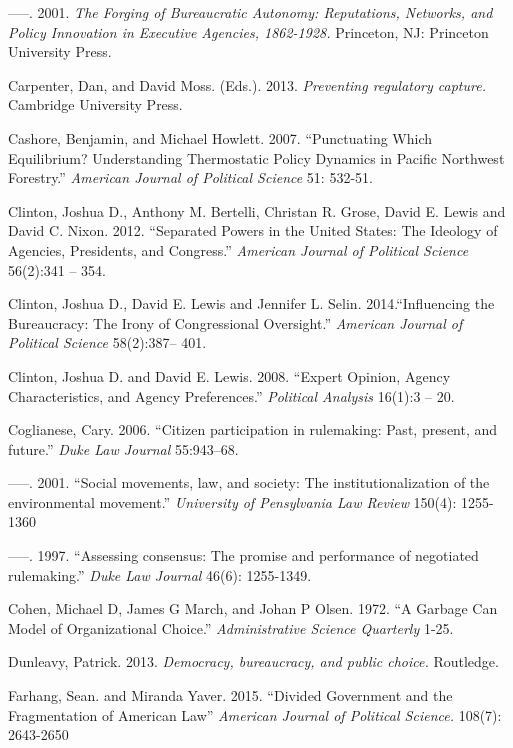 -----. 2001. \textit{The Forging of Bureaucratic Autonomy: Reputations, Networks, and Policy Innovation in Executive Agencies, 1862-1928.} Princeton, NJ: Princeton University Press.

Carpenter, Dan, and David Moss. (Eds.). 2013. \textit{Preventing regulatory capture.} Cambridge University Press.

Cashore, Benjamin, and Michael Howlett.  2007.  ``Punctuating Which Equilibrium? Understanding Thermostatic Policy Dynamics in Pacific Northwest Forestry.''  \textit{American Journal of Political Science} 51: 532-51.

Clinton, Joshua D., Anthony M. Bertelli, Christan R. Grose, David E. Lewis and David C. Nixon. 2012. ``Separated Powers in the United States: The Ideology of Agencies, Presidents, and Congress.'' \textit{American Journal of Political Science} 56(2):341 – 354.

Clinton, Joshua D., David E. Lewis and Jennifer L. Selin. 2014.``Influencing the Bureaucracy: The Irony of Congressional Oversight.'' \textit{American Journal of Political Science} 58(2):387– 401.

Clinton, Joshua D. and David E. Lewis. 2008. ``Expert Opinion, Agency Characteristics, and Agency Preferences.'' \textit{Political Analysis} 16(1):3 – 20.

Coglianese, Cary. 2006. ``Citizen participation in rulemaking: Past, present, and future.'' \textit{Duke Law Journal} 55:943–68.

-----. 2001. ``Social movements, law, and society: The institutionalization of the environmental movement.'' \textit{University of Pensylvania Law Review} 150(4): 1255-1360

-----. 1997. ``Assessing consensus: The promise and performance of negotiated rulemaking.'' \textit{Duke Law Journal} 46(6): 1255-1349.

Cohen, Michael D, James G March, and Johan P Olsen.  1972.  ``A Garbage Can Model of Organizational Choice.''  \textit{Administrative Science Quarterly} 1-25.

Dunleavy, Patrick. 2013. \textit{Democracy, bureaucracy, and public choice.} Routledge.


Farhang, Sean. and Miranda Yaver. 2015. ``Divided Government and the Fragmentation of American Law'' \textit{American Journal of Political Science.} 108(7): 2643-2650

